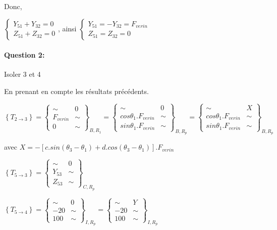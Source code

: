 Donc,

$\left\{\begin{array}{l}
Y_{51}+Y_{32}=0 \\
Z_{51}+Z_{32}=0
\end{array}\right.$, ainsi $\left\{\begin{array}{l}
Y_{51}=-Y_{32}=F_{verin} \\
Z_{51}=Z_{32}=0
\end{array}\right.$

\paragraph{Question 2:}

Isoler 3 et 4

En prenant en compte les résultats précédents.

$\left\{T_{2\rightarrow 3}\right\}=\left\{
\begin{array}{cc}
\sim & 0 \\
F_{verin} & \sim \\
0 & \sim
\end{array}
\right\}_{B,R_1}=\left\{
\begin{array}{cc}
\sim & 0 \\
cos\theta_1.F_{verin}  & \sim \\
sin\theta_1.F_{verin}  & \sim
\end{array}
\right\}_{B,R_p}=\left\{
\begin{array}{cc}
\sim & X \\
cos\theta_1.F_{verin} & \sim \\
sin\theta_1.F_{verin} & \sim
\end{array}
\right\}_{B,R_p}$

avec $X=-\left[c.sin(\theta_3-\theta_1)+d.cos(\theta_3-\theta_1)\right].F_{verin}$

$\left\{T_{5\rightarrow 3}\right\}=\left\{
\begin{array}{cc}
\sim & 0 \\
Y_{53} & \sim \\
Z_{53} & \sim
\end{array}
\right\}_{C,R_p}$

$\left\{T_{5\rightarrow 4}\right\}=\left\{
\begin{array}{cc}
\sim & 0 \\
-20 & \sim \\
100 & \sim
\end{array}
\right\}_{I,R_p}=\left\{
\begin{array}{cc}
\sim & Y \\
-20 & \sim \\
100 & \sim
\end{array}
\right\}_{I,R_p}$

